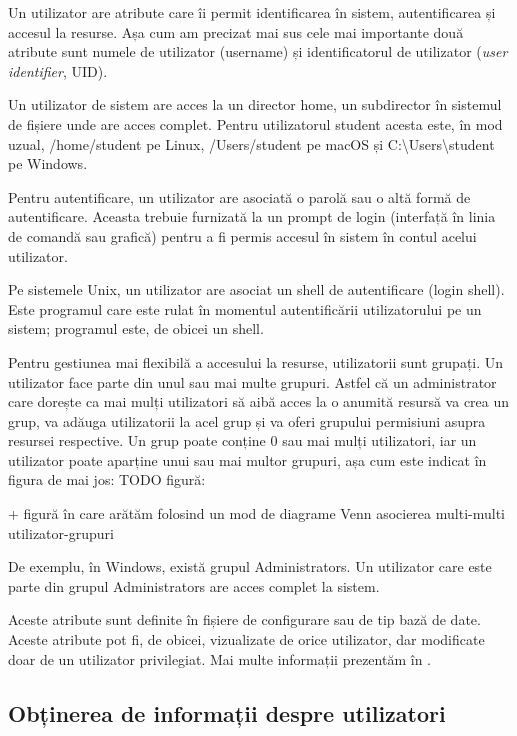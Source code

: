 Un utilizator are atribute care îi permit identificarea în sistem,
autentificarea și accesul la resurse. Așa cum am precizat mai sus cele mai
importante două atribute sunt numele de utilizator (username) și identificatorul
de utilizator (\textit{user identifier}, UID).

Un utilizator de sistem are acces la un director home, un subdirector în
sistemul de fișiere unde are acces complet. Pentru utilizatorul student acesta
este, în mod uzual, /home/student pe Linux, /Users/student pe macOS și
C:\textbackslash{}Users\textbackslash{}student pe Windows.

Pentru autentificare, un utilizator are asociată o parolă sau o altă formă de
autentificare. Aceasta trebuie furnizată la un prompt de login (interfață în
linia de comandă sau grafică) pentru a fi permis accesul în sistem în contul
acelui utilizator.

Pe sistemele Unix, un utilizator are asociat un shell de autentificare (login
shell). Este programul care este rulat în momentul autentificării utilizatorului
pe un sistem; programul este, de obicei un shell.

Pentru gestiunea mai flexibilă a accesului la resurse, utilizatorii sunt
grupați. Un utilizator face parte din unul sau mai multe grupuri. Astfel că un
administrator care dorește ca mai mulți utilizatori să aibă acces la o anumită
resursă va crea un grup, va adăuga utilizatorii la acel grup și va oferi
grupului permisiuni asupra resursei respective. Un grup poate conține 0 sau mai
mulți utilizatori, iar un utilizator poate aparține unui sau mai multor grupuri,
așa cum este indicat în figura de mai jos: TODO figură:

+ figură în care arătăm folosind un mod de diagrame Venn asocierea multi-multi utilizator-grupuri

De exemplu, în Windows, există grupul Administrators. Un utilizator care este
parte din grupul Administrators are acces complet la sistem.

Aceste atribute sunt definite în fișiere de configurare sau de tip bază de date.
Aceste atribute pot fi, de obicei, vizualizate de orice utilizator, dar
modificate doar de un utilizator privilegiat. Mai multe informații prezentăm în
.

\subsection{Obținerea de informații despre utilizatori}
\label{sec:users-ops-info}

